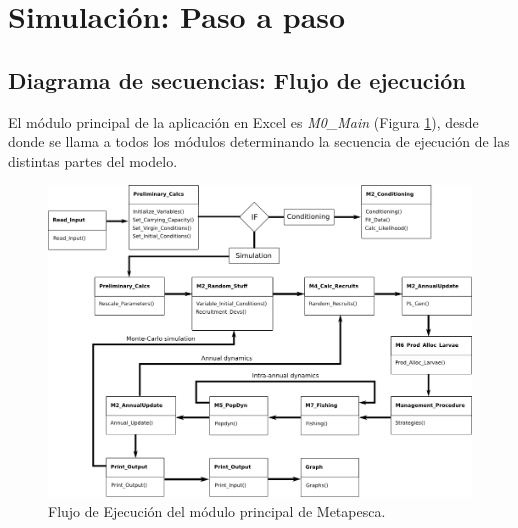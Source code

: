 \documentclass[12pt, oneside, a4paper]{article}
\begin{document}
	\section{Simulación: Paso a paso}
	
		\subsection{Diagrama de secuencias: Flujo de ejecución}
		El módulo principal de la aplicación en Excel es \emph{M0\_Main} (Figura \ref{fig:FlujoEjecucion}), desde donde se llama a todos los módulos determinando la secuencia de ejecución de las distintas partes del modelo.

		\begin{figure}[htb]
		\begin{center}
			\includegraphics[width=\textwidth]{DiagramaMetapesca.png}
		\caption{Flujo de Ejecución del módulo principal de Metapesca.}
		\label{fig:FlujoEjecucion}
		\end{center}
		\end{figure}
\end{document}
